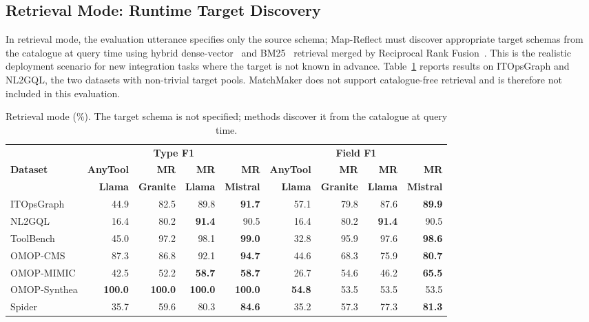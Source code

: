 \documentclass[sigconf, nonacm]{acmart}
\begin{document}
\subsection{Retrieval Mode: Runtime Target Discovery}
\label{sec:retrieval_results}

In retrieval mode, the evaluation utterance specifies only the source schema; Map-Reflect must discover appropriate target schemas from the catalogue at query time using hybrid dense-vector~\cite{karpukhin2020dpr} and BM25~\cite{robertson2009probabilistic} retrieval merged by Reciprocal Rank Fusion~\cite{cormack2009reciprocal}. This is the realistic deployment scenario for new integration tasks where the target is not known in advance. Table~\ref{tab:retrieval} reports results on ITOpsGraph and NL2GQL, the two datasets with non-trivial target pools. MatchMaker does not support catalogue-free retrieval and is therefore not included in this evaluation.

\begin{table}[htbp]
\centering
\small
\setlength{\tabcolsep}{5pt}
\caption{Retrieval mode (\%). The target schema is not specified; methods discover it from the catalogue at query time.}
\label{tab:retrieval}
\begin{tabular}{l rrrr rrrr}
\toprule
& \multicolumn{4}{c}{\textbf{Type F1}} & \multicolumn{4}{c}{\textbf{Field F1}} \\
\cmidrule(lr){2-5}\cmidrule(lr){6-9}
\textbf{Dataset} & \textbf{AnyTool} & \textbf{MR} & \textbf{MR} & \textbf{MR} & \textbf{AnyTool} & \textbf{MR} & \textbf{MR} & \textbf{MR} \\
& \textbf{Llama} & \textbf{Granite} & \textbf{Llama} & \textbf{Mistral} & \textbf{Llama} & \textbf{Granite} & \textbf{Llama} & \textbf{Mistral} \\
\midrule
ITOpsGraph   & 44.9 & 82.5 & 89.8 & \textbf{91.7} & 57.1 & 79.8 & 87.6 & \textbf{89.9} \\
NL2GQL       & 16.4 & 80.2 & \textbf{91.4} & 90.5 & 16.4 & 80.2 & \textbf{91.4} & 90.5 \\
ToolBench    & 45.0 & 97.2 & 98.1 & \textbf{99.0} & 32.8 & 95.9 & 97.6 & \textbf{98.6} \\
OMOP-CMS     & 87.3 & 86.8 & 92.1 & \textbf{94.7} & 44.6 & 68.3 & 75.9 & \textbf{80.7} \\
OMOP-MIMIC   & 42.5 & 52.2 & \textbf{58.7} & \textbf{58.7} & 26.7 & 54.6 & 46.2 & \textbf{65.5} \\
OMOP-Synthea & \textbf{100.0} & \textbf{100.0} & \textbf{100.0} & \textbf{100.0} & \textbf{54.8} & 53.5 & 53.5 & 53.5 \\
Spider       & 35.7 & 59.6 & 80.3 & \textbf{84.6} & 35.2 & 57.3 & 77.3 & \textbf{81.3} \\
\bottomrule
\end{tabular}
\end{table}
\end{document}
